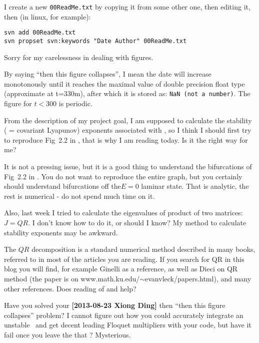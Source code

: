 \begin{description}
I create a new \texttt{00ReadMe.txt} by copying it from some other one,
then editing it, then (in linux, for example):
\begin{verbatim}
svn add 00ReadMe.txt
svn propset svn:keywords "Date Author" 00ReadMe.txt
\end{verbatim}

\item[2013-08-23 Xiong Ding]
Sorry for my carelessness in dealing with figures.

By saying ``then this figure collapses'', I mean the date will increase
monotonously until it reaches the
maximal value of double precision float type (approximate at t=330m),
after which it is stored as: \texttt{NaN (not a number)}.
The figure for $t<300$ is periodic.

\item[2013-08-26 Xiong Ding]
From the description of my project goal, I am supposed to calculate
the stability
( = covariant Lyapunov) exponents associated with \eqva, so I think I
should first try to reproduce Fig~2.2 in , that is why
I am reading  today. Is it the right way for me?

\item[2013-08-27 Predrag] It is not a pressing issue, but it is
 a good thing to understand the bifurcations of Fig~2.2 in
. You do not want to reproduce the entire graph, but
you certainly should understand bifurcations off the$E=0$ laminar state.
That is analytic, the rest is numerical - do not spend much time on
it.

\item[2013-08-26 Xiong Ding]
Also, last week I tried to calculate the eigenvalues of product of
two matrices: $J=QR$. I don't know how to do it, or should I know? My
method to calculate stability exponents may be awkward.

\item[2013-08-27 Predrag]
The $QR$ decomposition is a standard numerical method described in
many books, referred to in most of the articles you are reading. If
you search for QR in this blog you will find, for example Ginelli
\etal{} as a reference, as well as Dieci
\etal{} on QR method (the paper is on
{www.math.ku.edu/$\sim$evanvleck/papers.html}), and many other
references. Does reading of
 and  help?


\item[2013-08-27 Predrag]
Have you solved your {\bf [2013-08-23 Xiong Ding]} then ``then this
figure collapses'' problem? I cannot figure out how you could
accurately integrate an unstable \po\ and get decent leading Floquet
multipliers with your code, but have it fail once you leave the that
\po? Mysterious.


\end{description}
